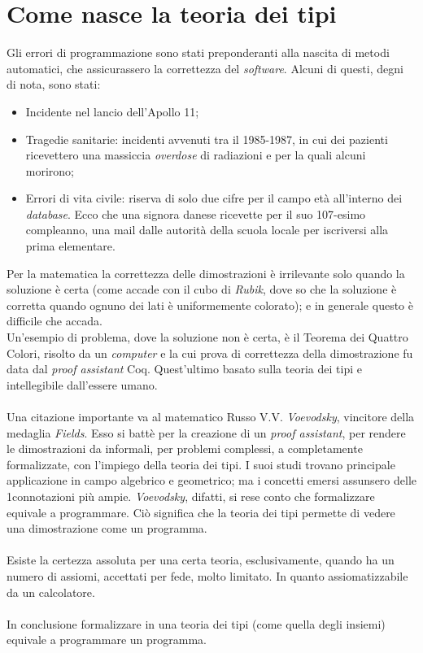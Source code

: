 \section{Come nasce la teoria dei tipi}
\label{sec:come-nasce}
Gli errori di programmazione sono stati preponderanti alla nascita di metodi automatici, che assicurassero la correttezza del \textit{software}. Alcuni di questi, degni di nota, sono stati:
\begin{itemize}
\item Incidente nel lancio dell'Apollo 11;
\item Tragedie sanitarie: incidenti avvenuti tra il 1985-1987, in cui dei pazienti ricevettero una massiccia \textit{overdose} di radiazioni e per la quali alcuni morirono;
\item Errori di vita civile: riserva di solo due cifre per il campo et\`a all'interno dei \textit{database}. Ecco che una signora danese ricevette per il suo 107-esimo compleanno, una mail dalle autorit\`a della scuola locale per iscriversi alla prima elementare.
\end{itemize}
\noindent 
Per la matematica la correttezza delle dimostrazioni \`e irrilevante solo quando la soluzione \`e certa (come accade con il cubo di \textit{Rubik}, dove so che la soluzione \`e corretta quando ognuno dei lati \`e uniformemente colorato); e in generale questo \`e difficile che accada.\\
Un'esempio di problema, dove la soluzione non \`e certa, \`e il Teorema dei Quattro Colori, risolto da un \textit{computer} e la cui prova di correttezza della dimostrazione fu data dal \textit{proof assistant} Coq. Quest'ultimo basato sulla teoria dei tipi e intellegibile dall'essere umano.\\\\
Una citazione importante va al matematico Russo V.V. \textit{Voevodsky}, vincitore della medaglia \textit{ Fields}. Esso si batt\`e per la creazione di un \textit{proof assistant}, per rendere le dimostrazioni da informali, per problemi complessi, a completamente formalizzate, con l'impiego della teoria dei tipi. I suoi studi trovano principale applicazione in campo algebrico e geometrico; ma i concetti emersi assunsero delle 1connotazioni pi\`u ampie. \textit{Voevodsky}, difatti, si rese conto che formalizzare equivale a programmare. Ci\`o significa che la teoria dei tipi permette di vedere una dimostrazione come un programma.
\\\\
Esiste la certezza assoluta per una certa teoria, esclusivamente, quando ha un numero di assiomi, accettati per fede, molto limitato. In quanto assiomatizzabile da un calcolatore.
\\\\
In conclusione formalizzare in una teoria dei tipi (come quella degli insiemi) equivale a programmare un programma.

